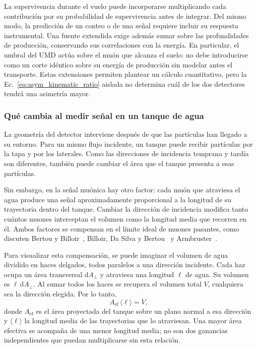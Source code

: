 La supervivencia durante el vuelo puede incorporarse multiplicando cada contribución por su probabilidad de supervivencia antes de integrar. Del mismo modo, la predicción de un conteo o de una señal requiere incluir su respuesta instrumental. Una fuente extendida exige además sumar sobre las profundidades de producción, conservando sus correlaciones con la energía. En particular, el umbral del UMD actúa sobre el muón que alcanza el suelo: no debe introducirse como un corte idéntico sobre su energía de producción sin modelar antes el transporte. Estas extensiones permiten plantear un cálculo cuantitativo, pero la Ec.~\ref{eq:asym_kinematic_ratio} aislada no determina cuál de los dos detectores tendrá una asimetría mayor.

\subsubsection{Qué cambia al medir señal en un tanque de agua}
\label{subsubsec:respuesta_tanque}

La geometría del detector interviene después de que las partículas han llegado a su entorno. Para un mismo flujo incidente, un tanque puede recibir partículas por la tapa y por los laterales. Como las direcciones de incidencia temprana y tardía son diferentes, también puede cambiar el área que el tanque presenta a esas partículas.

Sin embargo, en la señal muónica hay otro factor: cada muón que atraviesa el agua produce una señal aproximadamente proporcional a la longitud de su trayectoria dentro del tanque. Cambiar la dirección de incidencia modifica tanto cuántos muones interceptan el volumen como la longitud media que recorren en él. Ambos factores se compensan en el límite ideal de muones pasantes, como discuten Bertou y Billoir~\cite[Sec.~6]{GAP2000_017}, Billoir, Da Silva y Bertou~\cite[Sec.~2]{GAP2002_074} y Armbruster~\cite[Sec.~2.4]{Armbruster2018}.

Para visualizar esta compensación, se puede imaginar el volumen de agua dividido en haces delgados, todos paralelos a una dirección incidente. Cada haz ocupa un área transversal $\mathrm dA_\perp$ y atraviesa una longitud $\ell$ de agua. Su volumen es $\ell\,\mathrm dA_\perp$. Al sumar todos los haces se recupera el volumen total $V$, cualquiera sea la dirección elegida. Por lo tanto,
\begin{equation}
A_{\mathrm{ef}}\,\langle\ell\rangle=V,
\label{eq:compensacion_tanque}
\end{equation}
donde $A_{\mathrm{ef}}$ es el área proyectada del tanque sobre un plano normal a esa dirección y $\langle\ell\rangle$ la longitud media de las trayectorias que lo atraviesan. Una mayor área efectiva se acompaña de una menor longitud media; no son dos ganancias independientes que puedan multiplicarse sin esta relación.


